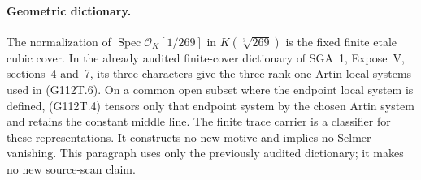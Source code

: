 \paragraph{Geometric dictionary.}
The normalization of \(\operatorname{Spec}\mathcal O_K[1/269]\)
in \(K(\sqrt[3]{269})\) is the fixed finite etale cubic cover.
In the already audited finite-cover dictionary of SGA~1,
Expose~V, sections~4 and~7, its three characters give the three
rank-one Artin local systems used in (G112T.6).  On a common open
subset where the endpoint local system is defined, (G112T.4)
tensors only that endpoint system by the chosen Artin system and
retains the constant middle line.  The finite trace carrier is a
classifier for these representations.  It constructs no new motive
and implies no Selmer vanishing.  This paragraph uses only the
previously audited dictionary; it makes no new source-scan claim.
